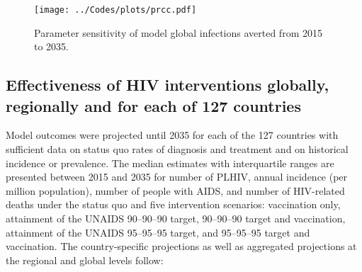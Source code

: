 \documentclass[11pt]{article}
\begin{document}
\begin{figure}
  \centering
  \texttt{[image: ../Codes/plots/prcc.pdf]}
  \caption{Parameter sensitivity of model global infections averted
    from 2015 to 2035.}
  \label{PRCCs}
\end{figure}


\subsection{Effectiveness of HIV interventions globally, regionally
  and for each of 127 countries}

Model outcomes were projected until 2035 for each of the 127 countries
with sufficient data on status quo rates of diagnosis and treatment
and on historical incidence or prevalence. The median estimates with
interquartile ranges are presented between 2015 and 2035 for number of
PLHIV, annual incidence (per million population), number of people
with AIDS, and number of HIV-related deaths under the status quo and
five intervention scenarios: vaccination only, attainment of the
UNAIDS 90--90--90 target, 90--90--90 target and vaccination, attainment of
the UNAIDS 95--95--95 target, and 95--95--95 target and vaccination.  The
country-specific projections as well as aggregated projections at the
regional and global levels follow:







\clearpage

\end{document}
